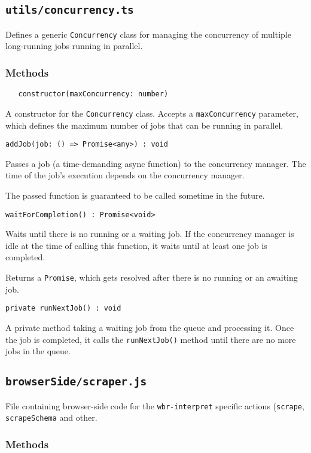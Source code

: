 \subsection{\texttt{utils/concurrency.ts}}

Defines a generic \texttt{Concurrency} class for managing the concurrency of multiple long-running jobs running in parallel.

\subsubsection{Methods}

\verb|   constructor(maxConcurrency: number)|
\smallskip

A constructor for the \texttt{Concurrency} class.
Accepts a \texttt{maxConcurrency} parameter, which defines the maximum number of jobs that can be running in parallel.

\emptyline
\verb|addJob(job: () => Promise<any>) : void |
\smallskip

Passes a job (a time-demanding async function) to the concurrency manager. 
The time of the job's execution depends on the concurrency manager.

The passed function is guaranteed to be called sometime in the future.

\emptyline
\verb|waitForCompletion() : Promise<void>|
\smallskip

Waits until there is no running or a waiting job.
If the concurrency manager is idle at the time of calling this function,
it waits until at least one job is completed.

Returns a \texttt{Promise}, which gets resolved after there is no running or an awaiting job.

\emptyline
\verb|private runNextJob() : void|
\smallskip

A private method taking a waiting job from the queue and processing it. 
Once the job is completed, it calls the \texttt{runNextJob()} method until there are no more jobs in the queue.

\subsection{\texttt{browserSide/scraper.js}}

File containing browser-side code for the \texttt{wbr-interpret} specific actions (\texttt{scrape}, \texttt{scrapeSchema} and other.

\subsubsection{Methods}

